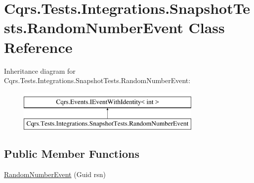\hypertarget{classCqrs_1_1Tests_1_1Integrations_1_1SnapshotTests_1_1RandomNumberEvent}{}\section{Cqrs.\+Tests.\+Integrations.\+Snapshot\+Tests.\+Random\+Number\+Event Class Reference}
\label{classCqrs_1_1Tests_1_1Integrations_1_1SnapshotTests_1_1RandomNumberEvent}
Inheritance diagram for Cqrs.\+Tests.\+Integrations.\+Snapshot\+Tests.\+Random\+Number\+Event\+:\begin{figure}[H]
\begin{center}
\leavevmode
\includegraphics[height=2.000000cm]{classCqrs_1_1Tests_1_1Integrations_1_1SnapshotTests_1_1RandomNumberEvent}
\end{center}
\end{figure}
\subsection*{Public Member Functions}
\begin{DoxyCompactItemize}
\item 
\hyperlink{classCqrs_1_1Tests_1_1Integrations_1_1SnapshotTests_1_1RandomNumberEvent_aa629e69d08cc883f54f3b1dae577b8a1_aa629e69d08cc883f54f3b1dae577b8a1}{Random\+Number\+Event} (Guid rsn)
\end{DoxyCompactItemize}

